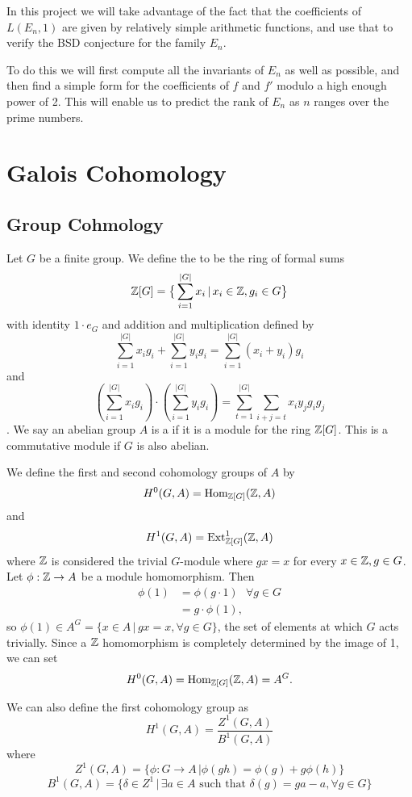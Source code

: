 \documentclass[12pt, a4paper]{amsart}
\begin{document}
In this project we will take advantage of the fact that the coefficients of
$L(E_n,1)$ are given by relatively simple arithmetic functions, and use that
to verify the BSD conjecture for the family $E_n$.

To do this we will first compute all the invariants of $E_n$ as well as
possible, and then find a simple form for the coefficients of $f$ and $f'$ modulo
a high enough power of 2. This will enable us to predict the rank of $E_n$ as
$n$ ranges over the prime numbers.

\section{Galois Cohomology}

\subsection{Group Cohmology}

Let $G$ be a finite group. We define the  to
be the ring of formal sums
\[ {\mathbb Z}[G] = \big\{ \sum\limits_{i=1}^{|G|} x_i \, | \, x_i \in {\mathbb Z}, g_i \in G \big\}\]
with identity $1 \cdot e_G$ and addition and multiplication defined by
\[\sum\limits_{i=1}^{|G|} x_ig_i + \sum\limits_{i=1}^{|G|} y_ig_i =
\sum\limits_{i=1}^{|G|} (x_i+y_i)g_i\]
and \[(\sum\limits_{i=1}^{|G|} x_ig_i) \cdot (\sum\limits_{i=1}^{|G|} y_ig_i) =
\sum\limits_{t=1}^{|G|} \sum\limits_{i+j = t} x_iy_jg_ig_j \].
We say an abelian group $A$ is a  if it is a module
for the ring ${\mathbb Z}[G]$. This is a commutative module if $G$ is also abelian.

We define the
first and second cohomology groups of $A$ by
\[H^0 (G, A) = \text{Hom}_{{\mathbb Z}[G]}({\mathbb Z}, A)\] and
\[H^1 (G, A) = \text{Ext}^1_{{\mathbb Z}[G]} ({\mathbb Z}, A)\]
where ${\mathbb Z}$ is considered the trivial $G$-module where $g x = x$ for every
$x \in {\mathbb Z}, g \in G$.
Let $\phi : {\mathbb Z} \rightarrow A$ be a module homomorphism. Then
\[\begin{split} \phi(1) &= \phi(g \cdot 1) \,\,\,\, \forall g \in G \\
    &= g \cdot \phi(1) , \end{split}\]
so $\phi(1) \in A^G = \{x \in A \, | \, gx = x, \forall g \in G\}$, the set
of elements at which $G$ acts trivially. Since a ${\mathbb Z}$ homomorphism is
completely determined by the image of 1, we can set
\[ H^0 (G, A) = \text{Hom}_{{\mathbb Z}[G]}({\mathbb Z}, A) = A^G .\] 

We can also define the first cohomology group as
\[H^1(G, A) = \frac{Z^1(G,A)}{B^1(G,A)}\]
where
\[Z^1(G,A) = \{ \phi : G \rightarrow A \, | \phi(gh) = \phi(g) + g \phi(h)\}\]
\[B^1(G,A) = \{ \delta \in Z^1 \, | \, \exists a \in A \,\,\text{such that}\,\, \delta(g)
  = ga - a , \forall g \in G\}\]
\end{document}

